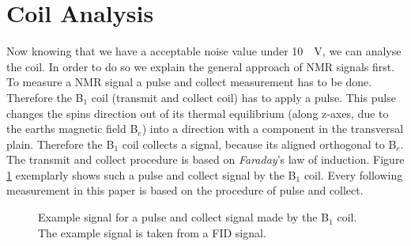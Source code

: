 \section{Coil Analysis}
\label{sec:CoilAnalyssis}
Now knowing that we have a acceptable noise value under \SI{10}{\mu \volt}, we can analyse the coil. In order to do so we explain the general approach of NMR signals first. To measure a NMR signal a pulse and collect measurement has to be done. Therefore the B$_1$ coil (transmit and collect coil) has to apply a pulse. This pulse changes the spins direction out of its thermal equilibrium (along z-axes, due to the earths magnetic field B$_e$) into a direction with a component in the transversal plain. Therefore the B$_1$ coil collects a signal, because its aligned orthogonal to B$_e$. The transmit and collect procedure is based on \textit{Faraday}'s law of induction. Figure \ref{fig: PulsandcollectValesignal} exemplarly shows such a pulse and collect signal by the B$_1$ coil. Every following measurement in this paper is based on the procedure of pulse and collect.

\begin{figure}[H]
    \centering
    
    \caption[Example signal for a pulse and collect signal made by the B$_1$ coil.]{Example signal for a pulse and collect signal made by the B$_1$ coil. The example signal is taken from a FID signal.}
    \label{fig: PulsandcollectValesignal}
\end{figure}

